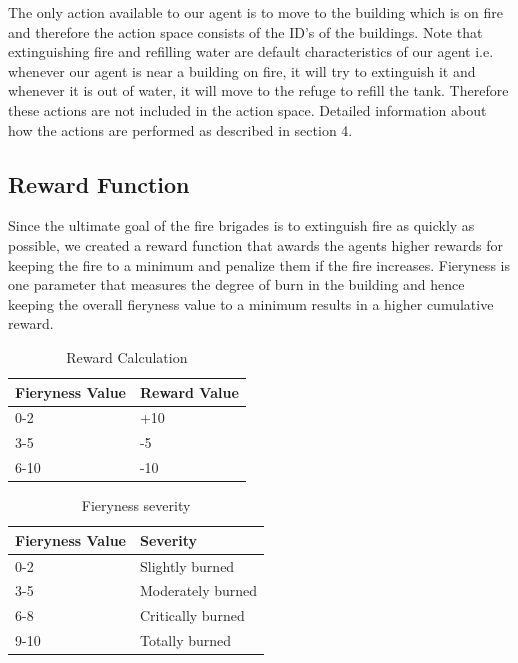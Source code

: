 \documentclass[12pt]{report}
\begin{document}
The only action available to our agent is to move to the building which is on fire and therefore the action space consists of the ID's of the buildings. Note that extinguishing fire and refilling water are default characteristics of our agent i.e. whenever our agent is near a building on fire, it will try to extinguish it and whenever it is out of water, it will move to the refuge to refill the tank. Therefore these actions are not included in the action space. Detailed information about how the actions are performed as described in section 4.
    
\subsection{Reward Function}
        
Since the ultimate goal of the fire brigades is to extinguish fire as quickly as possible, we created a reward function that awards the agents higher rewards for keeping the fire to a minimum and penalize them if the fire increases. Fieryness is one parameter that measures the degree of burn in the building and hence keeping the overall fieryness value to a minimum results in a higher cumulative reward. 
    
\begin{table} [!h]
\begin{center}
 \begin{tabular}{l | l} 
 \hline
 Fieryness Value & Reward Value  \\ [0.5ex] 
 \hline\hline
 0-2 & +10 \\
 3-5 & -5\\
 6-10 & -10  \\ 
 \hline
\end{tabular}
\caption{Reward Calculation}
\label{table:x}
\end{center}
\end{table}
 
 
\begin{table} [!h]
\begin{center}
 \begin{tabular}{l | l} 
 \hline
 Fieryness Value & Severity  \\ [0.5ex] 
 \hline\hline
 0-2 & Slightly burned \\
 3-5 & Moderately burned\\
 6-8 & Critically burned\\ 
 9-10 & Totally burned\\
 \hline
\end{tabular}
\caption{Fieryness severity}
\label{table:x}
\end{center}
\end{table}
\end{document}
